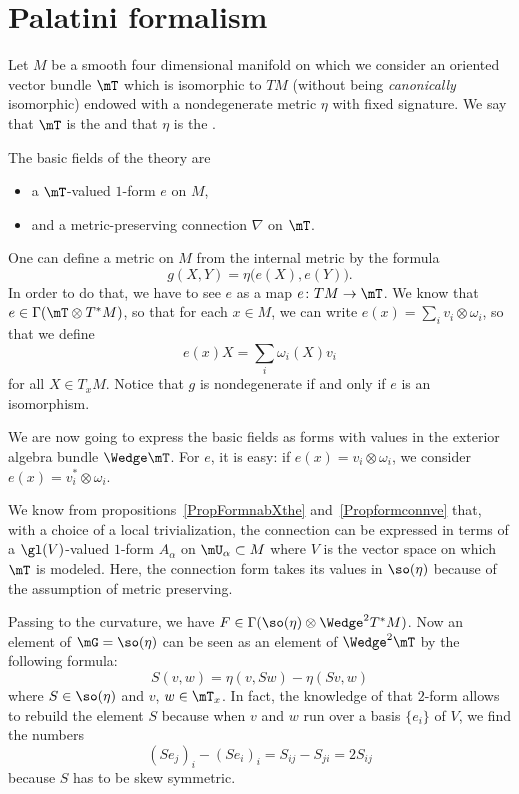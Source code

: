 \section{Palatini formalism}

Let $M$ be a smooth four dimensional manifold on which we consider an oriented vector bundle $\mT$ which is isomorphic to $TM$ (without being \emph{canonically} isomorphic) endowed with a nondegenerate metric $\eta$ with fixed signature. We say that $\mT$ is the  and that $\eta$ is the .

The basic fields of the theory are
\begin{itemize}
	\item a $\mT$-valued $1$-form $e$ on $M$,
	\item and a metric-preserving connection $\nabla$ on $\mT$.
\end{itemize}
One can define a metric on $M$ from the internal metric by the formula
\begin{equation}
	g(X,Y)=\eta\big( e(X),e(Y) \big).
\end{equation}
In order to do that, we have to see $e$ as a map $e\colon TM\to \mT$. We know that $e\in\Gamma(\mT\otimes T^*M)$, so that for each $x\in M$, we can write $e(x)=\sum_iv_i\otimes\omega_i$, so that we define
\[
	e(x)X=\sum_i\omega_i(X)v_i
\]
for all $X\in T_xM$. Notice that $g$ is nondegenerate if and only if $e$ is an isomorphism.

We are now going to express the basic fields as forms with values in the exterior algebra bundle $\Wedge\mT$. For $e$, it is easy: if $e(x)=v_i\otimes \omega_i$, we consider $e(x)=v_i^*\otimes\omega_i$.

We know from propositions~\ref{PropFormnabXthe} and~\ref{Propformconnve} that, with a choice of a local trivialization, the connection can be expressed in terms of a $\gl(V)$-valued $1$-form $A_{\alpha}$ on $\mU_{\alpha}\subset M$ where $V$ is the vector space on which $\mT$ is modeled. Here, the connection form takes its values in $\so(\eta)$ because of the assumption of metric preserving.

Passing to the curvature, we have $F\in\Gamma(\so(\eta)\otimes\Wedge^2T^*M)$. Now an element of $\mG=\so(\eta)$ can be seen as an element of $\Wedge^2\mT$ by the following formula:
\begin{equation}
	S(v,w)=\eta(v,Sw)-\eta(Sv,w)
\end{equation}
where $S\in\so(\eta)$ and $v$, $w\in \mT_x$. In fact, the knowledge of that $2$-form allows to rebuild the element $S$ because when $v$ and $w$ run over a basis $\{ e_i \}$ of $V$, we find the numbers
\[
	(Se_j)_{i}-(Se_i)_i=S_{ij}-S_{ji}=2S_{ij}
\]
because $S$ has to be skew symmetric.

